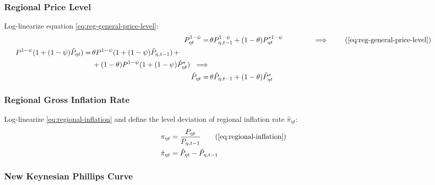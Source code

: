 \documentclass[
thesis.tex
]{subfiles}
\begin{document}

\subsubsection*{Regional Price Level}

Log-linearize equation \ref{eq:reg-general-price-level}:
\begin{align}
	P_{\eta t}^{1-\psi} =\, &\theta P_{\eta, t-1}^{1-\psi} + (1-\theta) P_{\eta t}^{\ast 1-\psi} \qquad \qquad \implies \tag{\ref{eq:reg-general-price-level}} \\
	\begin{split} P^{1-\psi} (1 + (1-\psi)\hat{P}_{\eta t}) =\, &\theta P^{1-\psi} (1 + (1-\psi)\hat{P}_{\eta, t-1}) \, + \\ & + (1-\theta) P^{1-\psi} (1 + (1-\psi)\hat{P}_{\eta t}^{\ast}) \ \implies \nonumber \end{split} \\
	\hat{P}_{\eta t} =\, &\theta \hat{P}_{\eta, t-1} + (1-\theta) \hat{P}_{\eta t}^{\ast}
	\label{eq:reg-ll-general-price-level}
\end{align}

		
	\subsubsection*{Regional Gross Inflation Rate}

	Log-linearize \ref{eq:regional-inflation} and define the level deviation of regional inflation rate $\hat{\pi}_{\eta t}$:
	\begin{align}
		\pi_{\eta t} &= \frac{P_{\eta t}}{P_{\eta, t-1}} \tag{\ref{eq:regional-inflation}} \\
		\hat{\pi}_{\eta t} &= \hat{P}_{\eta t} - \hat{P}_{\eta, t-1}
		\label{eq:level-dev-regional-inflation}
	\end{align}


\subsubsection*{New Keynesian Phillips Curve}
\end{document}
